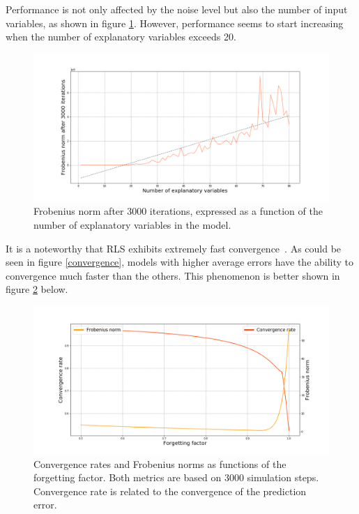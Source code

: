 Performance is not only affected by the noise level but also the number of
input variables, as shown in figure \ref{ninputs}. However, performance seems
to start increasing when the number of explanatory variables exceeds 20.

\begin{figure}[H]
    \begin{center}
        \includegraphics[width=\textwidth, keepaspectratio]{imgs/ninputs.png}
        \caption{Frobenius norm after 3000 iterations, expressed as a function of
            the number of explanatory variables in the model.}
        \label{ninputs}
    \end{center}
\end{figure}

It is a noteworthy that RLS exhibits extremely fast convergence~\cite{}.
As could be seen in figure \ref{convergence}, models with higher average errors
have the ability to convergence much faster than the others.
This phenomenon is better shown in figure \ref{convergencerate} below.

\begin{figure}[H]
    \begin{center}
        \includegraphics[width=\textwidth, keepaspectratio]{imgs/convergencerate.png}
        \caption{Convergence rates and Frobenius norms as functions of the forgetting factor.
            Both metrics are based on 3000 simulation steps. Convergence rate is related
            to the convergence of the prediction error.}
        \label{convergencerate}
    \end{center}
\end{figure}

